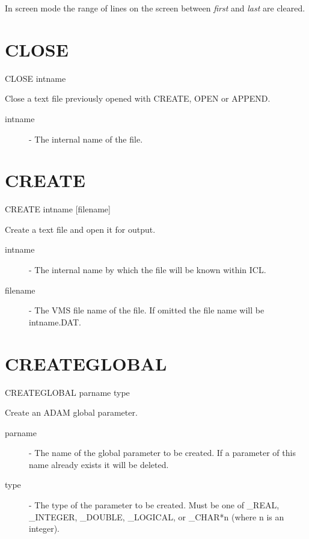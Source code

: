 In screen mode the range of lines on the screen between {\it first} and {\it
last} 
are cleared.

\section{CLOSE}
                                       
   CLOSE \hspace{.5cm} intname

 Close a text file previously opened with CREATE, OPEN or APPEND.

\begin{description}

\item[intname]  -  The internal name of the file.

\end{description}


\section{CREATE}
                                       
   CREATE \hspace{.5cm} intname \hspace{.5cm} [filename]

 Create a text file and open it for output.

\begin{description}

\item[intname]  -  The internal name by which the file will be known
                  within ICL.

\item[filename]  -  The VMS file name of the file. If omitted the
                  file name will be intname.DAT.

\end{description}

\section{CREATEGLOBAL}

   CREATEGLOBAL \hspace{.5cm} parname \hspace{.5cm} type

 Create an ADAM global parameter.

\begin{description}

\item[parname]  -  The name of the global parameter to be created. If
                  a parameter of this name already exists it will be deleted.

\item[type]     -  The type of the parameter to be created. Must be
                  one of \_REAL, \_INTEGER, \_DOUBLE, \_LOGICAL, or
                  \_CHAR*n (where n is an integer).

\end{description}

